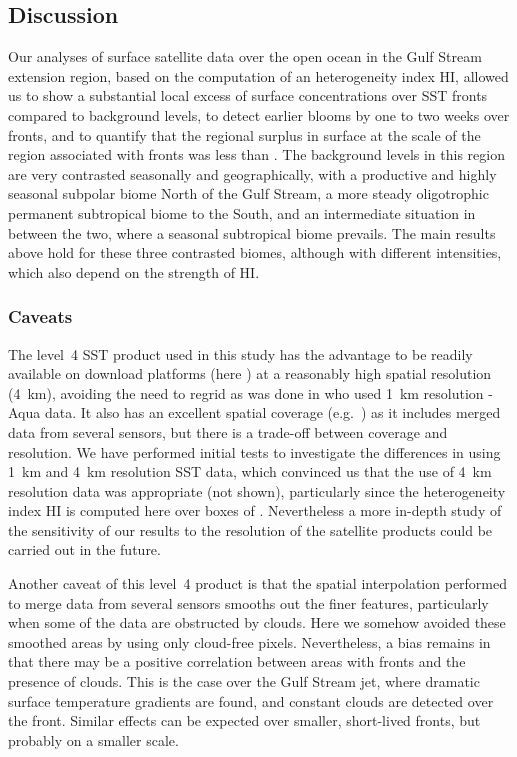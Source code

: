 \subsection{Discussion}

Our analyses of surface satellite data over the open ocean in the Gulf Stream extension region, based on the computation of an heterogeneity index HI, allowed us to show a substantial local excess of surface  concentrations over SST fronts compared to background levels, to detect earlier blooms by one to two weeks over fronts, and to quantify that the regional surplus in surface  at the scale of the region associated with fronts was less than .
The background levels in this region are very contrasted seasonally and geographically, with a productive and highly seasonal subpolar biome North of the Gulf Stream, a more steady oligotrophic permanent subtropical biome to the South, and an intermediate situation in between the two, where a seasonal subtropical biome prevails.
The main results above hold for these three contrasted biomes, although with different intensities, which also depend on the strength of HI\@.

\subsubsection{Caveats}

The level~4 SST product used in this study has the advantage to be readily available on download platforms (here ) at a reasonably high spatial resolution (\qty{4}{\km}), avoiding the need to regrid as was done in \textcite{liu_2016} who used \qty{1}{\km} resolution  -Aqua data.
It also has an excellent spatial coverage (e.g.\ ) as it includes merged data from several sensors, but there is a trade-off between coverage and resolution.
We have performed initial tests to investigate the differences in using \qty{1}{\km} and \qty{4}{\km} resolution SST data, which convinced us that the use of \qty{4}{\km} resolution data was appropriate (not shown), particularly since the heterogeneity index HI is computed here over boxes of .
Nevertheless a more in-depth study of the sensitivity of our results to the resolution of the satellite products could be carried out in the future.

Another caveat of this level~4 product is that the spatial interpolation performed to merge data from several sensors smooths out the finer features, particularly when some of the data are obstructed by clouds.
Here we somehow avoided these smoothed areas by using only cloud-free  pixels.
Nevertheless, a bias remains in that there may be a positive correlation between areas with fronts and the presence of clouds.
This is the case over the Gulf Stream jet, where dramatic surface temperature gradients are found, and constant clouds are detected over the front.
Similar effects can be expected over smaller, short-lived fronts, but probably on a smaller scale.

